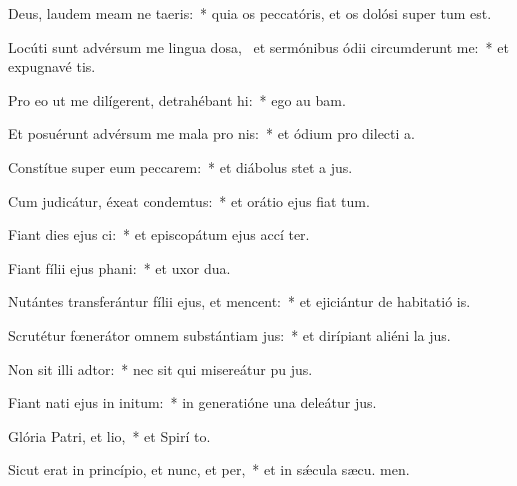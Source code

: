 \item Deus, laudem meam ne taeris:~* quia os peccatóris, et os dolósi super  tum est.
\item Locúti sunt advérsum me lingua dosa,~\pscross{} et sermónibus ódii circumderunt me:~* et expugnavé  tis.
\item Pro eo ut me dilígerent, detrahébant hi:~* ego au bam.
\item Et posuérunt advérsum me mala pro nis:~* et ódium pro dilecti a.
\item Constítue super eum peccarem:~* et diábolus stet a  jus.
\item Cum judicátur, éxeat condemtus:~* et orátio ejus fiat  tum.
\item Fiant dies ejus ci:~* et episcopátum ejus accí ter.
\item Fiant fílii ejus phani:~* et uxor  dua.
\item Nutántes transferántur fílii ejus, et mencent:~* et ejiciántur de habitatió is.
\item Scrutétur fœnerátor omnem substántiam jus:~* et dirípiant aliéni la jus.
\item Non sit illi adtor:~* nec sit qui misereátur pu jus.
\item Fiant nati ejus in initum:~* in generatióne una deleátur  jus.
\item Glória Patri, et lio,~* et Spirí to.
\item Sicut erat in princípio, et nunc, et per,~* et in sǽcula sæcu. men.
